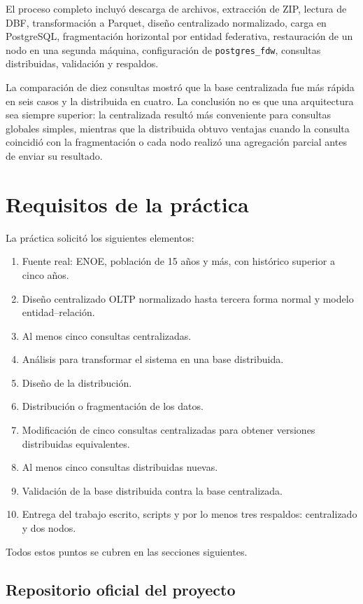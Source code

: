 \documentclass[12pt,letterpaper]{article}
\begin{document}
El proceso completo incluyó descarga de archivos, extracción de ZIP, lectura de
DBF, transformación a Parquet, diseño centralizado normalizado, carga en
PostgreSQL, fragmentación horizontal por entidad federativa, restauración de un
nodo en una segunda máquina, configuración de \texttt{postgres\_fdw},
consultas distribuidas, validación y respaldos.

La comparación de diez consultas mostró que la base centralizada fue más rápida
en seis casos y la distribuida en cuatro. La conclusión no es que una
arquitectura sea siempre superior: la centralizada resultó más conveniente
para consultas globales simples, mientras que la distribuida obtuvo ventajas
cuando la consulta coincidió con la fragmentación o cada nodo realizó una
agregación parcial antes de enviar su resultado.

\section{Requisitos de la práctica}

La práctica solicitó los siguientes elementos:

\begin{enumerate}[label=\arabic*.]
  \item Fuente real: ENOE, población de 15 años y más, con histórico superior a cinco años.
  \item Diseño centralizado OLTP normalizado hasta tercera forma normal y modelo entidad--relación.
  \item Al menos cinco consultas centralizadas.
  \item Análisis para transformar el sistema en una base distribuida.
  \item Diseño de la distribución.
  \item Distribución o fragmentación de los datos.
  \item Modificación de cinco consultas centralizadas para obtener versiones distribuidas equivalentes.
  \item Al menos cinco consultas distribuidas nuevas.
  \item Validación de la base distribuida contra la base centralizada.
  \item Entrega del trabajo escrito, scripts y por lo menos tres respaldos: centralizado y dos nodos.
\end{enumerate}

Todos estos puntos se cubren en las secciones siguientes.

\subsection{Repositorio oficial del proyecto}
\end{document}

